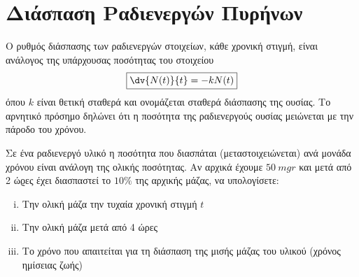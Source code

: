 \section*{Διάσπαση Ραδιενεργών Πυρήνων}

Ο ρυθμός διάσπασης των ραδιενεργών στοιχείων, κάθε χρονική στιγμή, είναι ανάλογος της 
υπάρχουσας ποσότητας του στοιχείου
\[
  \boxed{\dv{N(t)}{t} = -k N(t)}
\] 
όπου $k$ είναι θετική σταθερά και ονομάζεται σταθερά διάσπασης της ουσίας. Το αρνητικό 
πρόσημο δηλώνει ότι η ποσότητα της ραδιενεργούς ουσίας μειώνεται με την πάροδο του 
χρόνου.

\begin{myboxs1}
\begin{problem}
  Σε ένα ραδιενεργό υλικό η ποσότητα που διασπάται (μεταστοιχειώνεται) ανά μονάδα 
  χρόνου είναι ανάλογη της ολικής ποσότητας. Αν αρχικά έχουμε $ \SI{50}{mgr} $ και 
  μετά από 2 ώϱες έχει διασπαστεί το $ 10 \% $ της αρχικής μάζας, να υπολογίσετε:
  \begin{enumerate}[i)]
    \item Την ολική μάζα την τυχαία χρονική στιγμή $t$ 
    \item Την ολική μάζα μετά από 4 ώρες
    \item Το χρόνο που απαιτείται για τη διάσπαση της μισής μάζας του υλικού (χρόνος
      ημίσειας ζωής)
  \end{enumerate}
\end{problem}
\end{myboxs1}
